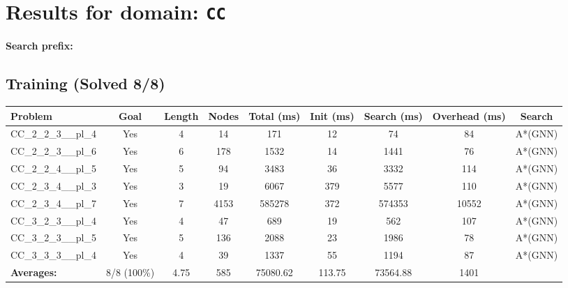 \documentclass{article}
\begin{document}
\section*{Results for domain: \texttt{CC}}
\textbf{Search prefix:} 
\\[0.5cm]
\subsection*{Training (Solved 8/8)}
\begin{tabular}{lcccccccc}
\toprule
Problem & Goal & Length & Nodes & Total (ms) & Init (ms) & Search (ms) & Overhead (ms) & Search \\
\midrule
CC\_2\_2\_3\_\_pl\_4 & Yes & 4 & 14 & 171 & 12 & 74 & 84 & A*(GNN) \\
CC\_2\_2\_3\_\_pl\_6 & Yes & 6 & 178 & 1532 & 14 & 1441 & 76 & A*(GNN) \\
CC\_2\_2\_4\_\_pl\_5 & Yes & 5 & 94 & 3483 & 36 & 3332 & 114 & A*(GNN) \\
CC\_2\_3\_4\_\_pl\_3 & Yes & 3 & 19 & 6067 & 379 & 5577 & 110 & A*(GNN) \\
CC\_2\_3\_4\_\_pl\_7 & Yes & 7 & 4153 & 585278 & 372 & 574353 & 10552 & A*(GNN) \\
CC\_3\_2\_3\_\_pl\_4 & Yes & 4 & 47 & 689 & 19 & 562 & 107 & A*(GNN) \\
CC\_3\_2\_3\_\_pl\_5 & Yes & 5 & 136 & 2088 & 23 & 1986 & 78 & A*(GNN) \\
CC\_3\_3\_3\_\_pl\_4 & Yes & 4 & 39 & 1337 & 55 & 1194 & 87 & A*(GNN) \\
\textbf{Averages:} & 8/8 (100\%) & 4.75 & 585 & 75080.62 & 113.75 & 73564.88 & 1401 & \\
\bottomrule
\end{tabular}
\\[0.7cm]
\end{document}
